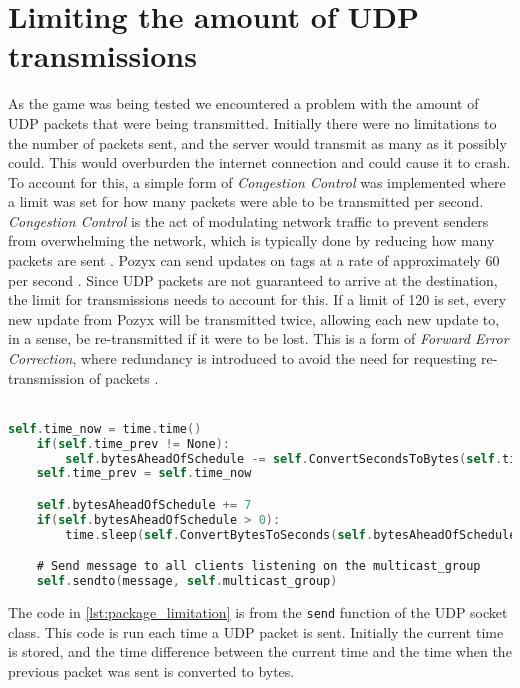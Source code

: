 \section{Limiting the amount of UDP transmissions}\label{sec:sprint5-transmissionlimit}
As the game was being tested we encountered a problem with the amount of UDP packets that were being transmitted.
Initially there were no limitations to the number of packets sent, and the server would transmit as many as it possibly could.
This would overburden the internet connection and could cause it to crash.
To account for this, a simple form of \textit{Congestion Control} was implemented where a limit was set for how many packets were able to be transmitted per second.
\textit{Congestion Control} is the act of modulating network traffic to prevent senders from overwhelming the network, which is typically done by reducing how many packets are sent \cite{CongestionControl}.
Pozyx can send updates on tags at a rate of approximately 60 per second \cite{pozyxfaq}.
Since UDP packets are not guaranteed to arrive at the destination, the limit for transmissions needs to account for this.
If a limit of 120 is set, every new update from Pozyx will be transmitted twice, allowing each new update to, in a sense, be re-transmitted if it were to be lost.
This is a form of \textit{Forward Error Correction}, where redundancy is introduced to avoid the need for requesting re-transmission of packets \cite{ForwardErrorCorrection}.
\\\\
\begin{lstlisting}[caption={Implementaion of the limit on the amount of packets that can be sent per second}, captionpos=b,language=C,label={lst:package_limitation}]
    self.time_now = time.time()
    if(self.time_prev != None):
        self.bytesAheadOfSchedule -= self.ConvertSecondsToBytes(self.time_now - self.time_prev)
    self.time_prev = self.time_now

    self.bytesAheadOfSchedule += 7
    if(self.bytesAheadOfSchedule > 0):
        time.sleep(self.ConvertBytesToSeconds(self.bytesAheadOfSchedule))

    # Send message to all clients listening on the multicast_group
    self.sendto(message, self.multicast_group)
\end{lstlisting}
The code in \autoref{lst:package_limitation} is from the \texttt{send} function of the UDP socket class.
This code is run each time a UDP packet is sent.
Initially the current time is stored, and the time difference between the current time and the time when the previous packet was sent is converted to bytes.

